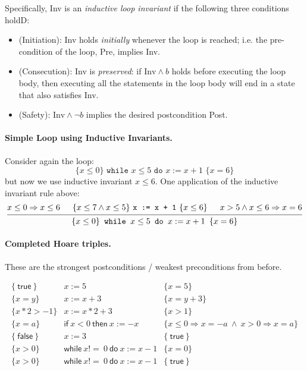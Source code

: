 \documentclass[11pt]{article}
\begin{document}
Specifically, Inv is an \emph{inductive loop invariant} if the following three conditions holdD:
\begin{itemize}[noitemsep]
\item (Initiation): Inv holds \emph{initially} whenever the loop is reached; i.e. the pre-condition of the loop, Pre,
  implies Inv.
\item (Consecution): Inv is \emph{preserved}: if $\mathrm{Inv} \wedge b$ holds before executing the loop body, then executing all the statements in the loop body will end in a state that also satisfies Inv.
\item (Safety): $\mathrm{Inv} \wedge \neg b$ implies the desired postcondition Post.
\end{itemize}

\paragraph{Simple Loop using Inductive Invariants.} Consider again the loop:
\[ \{ x \leq 0 \} \texttt{~while $x \leq 5$ do $x := x + 1$~}  \{ x=6\} \]
but now we use inductive invariant $x \leq 6$. One application of the inductive invariant rule above:
\[
\begin{prooftree}
  \hypo{x \leq 0 \Rightarrow x \leq 6}
  \hypo{\{ x \leq 7 \wedge x \leq 5 \} ~\texttt{x := x + 1}~ \{ x \leq 6 \}}
  \hypo{x > 5 \wedge x \leq 6 \Rightarrow x = 6}
  \infer3{\{ x \leq 0\}\texttt{~while $x \leq 5$ do $x := x + 1$~}  \{ x=6\}}
\end{prooftree}
\]

\paragraph{Completed Hoare triples.} These are the strongest postconditions / weakest preconditions from before.

\[
\begin{array}{lll}
  \{ \mathsf{~true~} \} & x := 5 &\{ x = 5 \} \\
  \{ x = y \} & x := x + 3 &\{ x = y + 3 \} \\
  \{ x * 2 > -1 \} & x := x * 2 + 3 &\{ x > 1 \} \\
  \{ x = a \} & \mathsf{if~} x < 0 \mathsf{~then~} x := -x  &\{ x \leq 0 \Rightarrow x = -a ~\wedge~ x > 0 \Rightarrow x = a \} \\
  \{ \mathsf{~false~} \} & x := 3  &\{ \mathsf{~true~} \} \\
  \{ x > 0 \} & \mathsf{while~} x \mathtt{!=~} 0 \mathsf{~do~} x := x - 1  &\{ x = 0 \} \\
  \{ x > 0 \} & \mathsf{while~} x \mathtt{!=~} 0 \mathsf{~do~} x := x - 1 & \{ \mathsf{~true~} \} \\
\end{array}
\]
\end{document}
